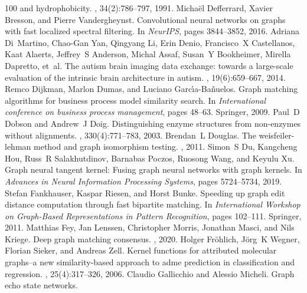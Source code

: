 \begin{thebibliography}{100}
  and hydrophobicity.
, 34(2):786--797, 1991.
Micha{\"e}l Defferrard, Xavier Bresson, and Pierre Vandergheynst.
\newblock Convolutional neural networks on graphs with fast localized spectral
  filtering.
\newblock In {\em NeurIPS}, pages 3844--3852, 2016.
Adriana Di~Martino, Chao-Gan Yan, Qingyang Li, Erin Denio, Francisco~X
  Castellanos, Kaat Alaerts, Jeffrey~S Anderson, Michal Assaf, Susan~Y
  Bookheimer, Mirella Dapretto, et~al.
\newblock The autism brain imaging data exchange: towards a large-scale
  evaluation of the intrinsic brain architecture in autism.
, 19(6):659--667, 2014.
Remco Dijkman, Marlon Dumas, and Luciano Garc{\'\i}a-Ba{\~n}uelos.
\newblock Graph matching algorithms for business process model similarity
  search.
\newblock In {\em International conference on business process management},
  pages 48--63. Springer, 2009.
Paul~D Dobson and Andrew~J Doig.
\newblock Distinguishing enzyme structures from non-enzymes without alignments.
, 330(4):771--783, 2003.
Brendan~L Douglas.
\newblock The weisfeiler-lehman method and graph isomorphism testing.
, 2011.
Simon~S Du, Kangcheng Hou, Russ~R Salakhutdinov, Barnabas Poczos, Ruosong Wang,
  and Keyulu Xu.
\newblock Graph neural tangent kernel: Fusing graph neural networks with graph
  kernels.
\newblock In {\em Advances in Neural Information Processing Systems}, pages
  5724--5734, 2019.
Stefan Fankhauser, Kaspar Riesen, and Horst Bunke.
\newblock Speeding up graph edit distance computation through fast bipartite
  matching.
\newblock In {\em International Workshop on Graph-Based Representations in
  Pattern Recognition}, pages 102--111. Springer, 2011.
Matthias Fey, Jan Lenssen, Christopher Morris, Jonathan Masci, and Nils Kriege.
\newblock Deep graph matching consensus.
, 2020.
Holger Fr{\"o}hlich, J{\"o}rg~K Wegner, Florian Sieker, and Andreas Zell.
\newblock Kernel functions for attributed molecular graphs--a new
  similarity-based approach to adme prediction in classification and
  regression.
, 25(4):317--326, 2006.
Claudio Gallicchio and Alessio Micheli.
\newblock Graph echo state networks.

\end{thebibliography}
